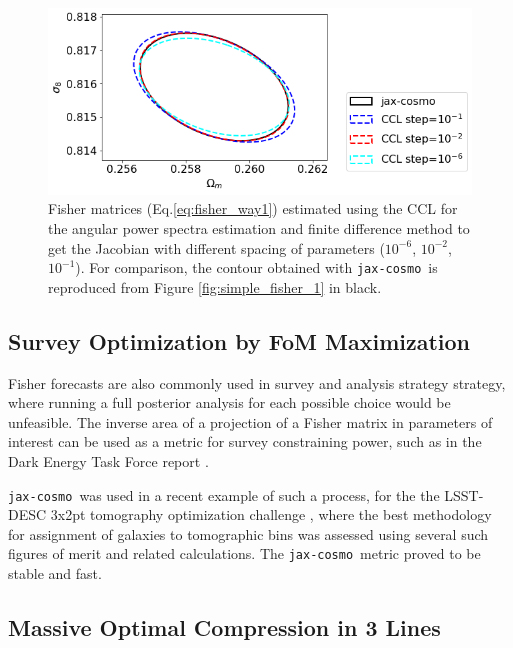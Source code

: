 \documentclass[twocolumn,twocolappendix,nofootinbib,iop]{openjournal}
\newcommand{\jaxcosmo}{\texttt{jax-cosmo}}
\begin{document}
\begin{figure}
    \centering
    \includegraphics[width=\columnwidth]{figures/simple_fisher_2.png}
    \caption{Fisher matrices (Eq.\ref{eq:fisher_way1}) estimated using the CCL for the angular power spectra estimation and finite difference method to get the Jacobian  with different spacing of parameters ($10^{-6}$, $10^{-2}$, $10^{-1}$). For comparison, the contour obtained with \jaxcosmo\ is reproduced from Figure \ref{fig:simple_fisher_1} in black.} 
    \label{fig:simple_fisher_2}
\end{figure}


%
\subsection{Survey Optimization by FoM Maximization}
\label{sec-FOM-optimisation}

Fisher forecasts are also commonly used in survey and analysis strategy strategy, where running a full posterior analysis for each possible choice would be unfeasible. The inverse area of a projection of a Fisher matrix in parameters of interest can be used as a metric for survey constraining power, such as in the Dark Energy Task Force report \citep{2006astro.ph..9591A}.

\jaxcosmo\ was used in a recent example of such a process, for the  the LSST-DESC 3x2pt tomography optimization challenge \citep{2021OJAp....4E..13Z}, where the best methodology for assignment of galaxies to tomographic bins was assessed using several such figures of merit and related calculations. The \jaxcosmo\ metric proved to be stable and fast.



\subsection{Massive Optimal Compression in 3 Lines}
\end{document}
